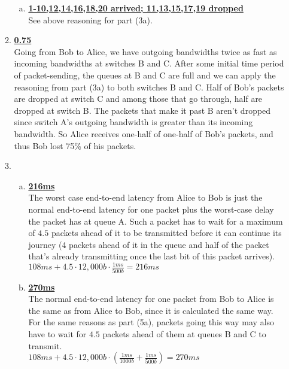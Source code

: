\documentclass[11pt,fleqn]{article}
\begin{document}
\begin{enumerate}[1)]
\begin{enumerate}[1.]
\begin{enumerate}[(a)]
\item {\bf\underline{1-10,12,14,16,18,20 arrived; 11,13,15,17,19 dropped}} \\ See above reasoning for part (3a).
\end{enumerate}
\item {\bf\underline{0.75}} \\ Going from Bob to Alice, we have outgoing bandwidths twice as fast as incoming bandwidths at switches B and C. After some initial time period of packet-sending, the queues at B and C are full and we can apply the reasoning from part (3a) to both switches B and C. Half of Bob's packets are dropped at switch C and among those that go through, half are dropped at switch B. The packets that make it past B aren't dropped since switch A's outgoing bandwidth is greater than its incoming bandwidth. So Alice receives one-half of one-half of Bob's packets, and thus Bob lost 75\% of his packets.
\item
\begin{enumerate}[(a)]
\item {\bf\underline{216ms}} \\ The worst case end-to-end latency from Alice to Bob is just the normal end-to-end latency for one packet plus the worst-case delay the packet has at queue A. Such a packet has to wait for a maximum of $4.5$ packets ahead of it to be transmitted before it can continue its journey (4 packets ahead of it in the queue and half of the packet that's already transmitting once the last bit of this packet arrives). \\
$\displaystyle 108ms + 4.5\cdot 12,000b \cdot \frac{1ms}{500b} = 216ms$
\item {\bf\underline{270ms}} \\ The normal end-to-end latency for one packet from Bob to Alice is the same as from Alice to Bob, since it is calculated the same way. For the same reasons as part (5a), packets going this way may also have to wait for $4.5$ packets ahead of them at queues B and C to transmit. \\
$\displaystyle 108ms + 4.5\cdot 12,000b \cdot (\frac{1ms}{1000b} + \frac{1ms}{500b}) = 270ms$
\end{enumerate}
\end{enumerate}


\end{enumerate}
\end{document}

